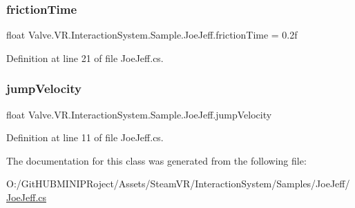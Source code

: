 \subsubsection{\texorpdfstring{frictionTime}{frictionTime}}
{\footnotesize\ttfamily float Valve.\+V\+R.\+Interaction\+System.\+Sample.\+Joe\+Jeff.\+friction\+Time = 0.\+2f}



Definition at line 21 of file Joe\+Jeff.\+cs.

\mbox{\label{class_valve_1_1_v_r_1_1_interaction_system_1_1_sample_1_1_joe_jeff_ad893033ab5e6be7e1db32c979a98b1cc}} 
\subsubsection{\texorpdfstring{jumpVelocity}{jumpVelocity}}
{\footnotesize\ttfamily float Valve.\+V\+R.\+Interaction\+System.\+Sample.\+Joe\+Jeff.\+jump\+Velocity}



Definition at line 11 of file Joe\+Jeff.\+cs.



The documentation for this class was generated from the following file\+:\begin{DoxyCompactItemize}
\item 
O\+:/\+Git\+H\+U\+B\+M\+I\+N\+I\+P\+Roject/\+Assets/\+Steam\+V\+R/\+Interaction\+System/\+Samples/\+Joe\+Jeff/\mbox{\hyperlink{_joe_jeff_8cs}{Joe\+Jeff.\+cs}}\end{DoxyCompactItemize}
